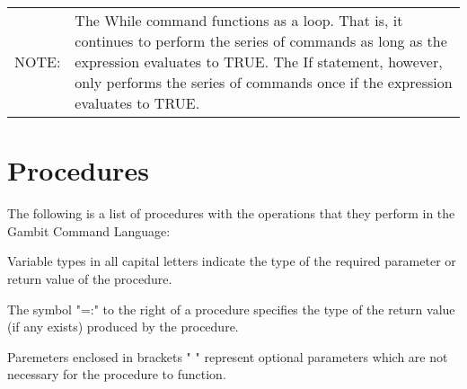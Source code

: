 \begin{tabular}{lp{}}
NOTE: & The While command functions as a loop.  That is, it continues
to perform the series of commands as long as the expression
evaluates to TRUE.  The If statement, however, only performs the
series of commands once if the expression evaluates to TRUE.\\
\end{tabular}

\section*{Procedures}

The following is a list of procedures with the operations that they perform
in the Gambit Command Language:

Variable types in all capital letters indicate the type of the required
parameter or return value of the procedure.

The symbol "=:" to the right of a procedure specifies the type of the return
value (if any exists) produced by the procedure.

Paremeters enclosed in brackets "{ }" represent optional parameters which
are not necessary for the procedure to function.

